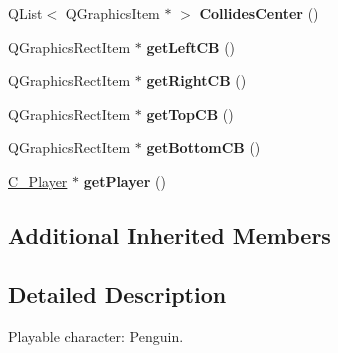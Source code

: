 \begin{DoxyCompactItemize}
\item 
\hypertarget{class_p___penguin_a1dcd291cc67f4e31b21f11777c625c34}{}Q\+List$<$ Q\+Graphics\+Item $\ast$ $>$ {\bfseries Collides\+Center} ()\label{class_p___penguin_a1dcd291cc67f4e31b21f11777c625c34}

\item 
\hypertarget{class_p___penguin_a0932c4618418db8794c5036c13b91dc4}{}Q\+Graphics\+Rect\+Item $\ast$ {\bfseries get\+Left\+C\+B} ()\label{class_p___penguin_a0932c4618418db8794c5036c13b91dc4}

\item 
\hypertarget{class_p___penguin_a32c44ca60c6fbe58ba449b6d7f263250}{}Q\+Graphics\+Rect\+Item $\ast$ {\bfseries get\+Right\+C\+B} ()\label{class_p___penguin_a32c44ca60c6fbe58ba449b6d7f263250}

\item 
\hypertarget{class_p___penguin_a1a3f91feca96abe626bf2ce39c7e5845}{}Q\+Graphics\+Rect\+Item $\ast$ {\bfseries get\+Top\+C\+B} ()\label{class_p___penguin_a1a3f91feca96abe626bf2ce39c7e5845}

\item 
\hypertarget{class_p___penguin_a8266330eda74483fd5d3d488c2c6325d}{}Q\+Graphics\+Rect\+Item $\ast$ {\bfseries get\+Bottom\+C\+B} ()\label{class_p___penguin_a8266330eda74483fd5d3d488c2c6325d}

\item 
\hypertarget{class_p___penguin_a9b84dba76ea12eab06c2c8e57c689d27}{}\hyperlink{class_c___player}{C\+\_\+\+Player} $\ast$ {\bfseries get\+Player} ()\label{class_p___penguin_a9b84dba76ea12eab06c2c8e57c689d27}

\end{DoxyCompactItemize}
\subsection*{Additional Inherited Members}


\subsection{Detailed Description}
Playable character\+: Penguin. 

